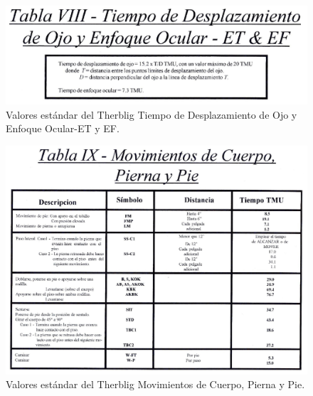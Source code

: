     \begin{figure}[H]
        \centering
        \includegraphics[scale=0.35]{3/Img/tabla8TiempoDeDesplazamientoDeOjo.pdf}
        \caption{Valores estándar del Therblig Tiempo de Desplazamiento de Ojo y Enfoque Ocular-ET y EF.}
        \label{fig:tabla8TiempoDeDesplazamientoDeOjo}
    \end{figure}
    \begin{figure}[H]
        \centering
        \includegraphics[scale=0.35]{3/Img/tabla9MovimientosDeCuerpoPiernaYPie.pdf}
        \caption{Valores estándar del Therblig Movimientos de Cuerpo, Pierna y Pie.}
        \label{fig:tabla9MovimientosDeCuerpoPiernaYPie}
    \end{figure}
